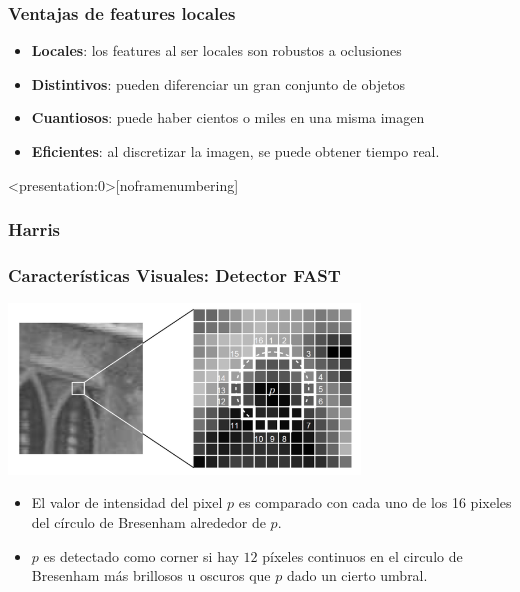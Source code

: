 \begin{frame}
	\frametitle{Ventajas de features locales}
	\footnotesize

	\begin{itemize}
	\item \textbf{Locales}: los features al ser locales son robustos a oclusiones
	\item \textbf{Distintivos}: pueden diferenciar un gran conjunto de objetos
	\item \textbf{Cuantiosos}: puede haber cientos o miles en una misma imagen
	\item \textbf{Eficientes}: al discretizar la imagen, se puede obtener tiempo real.
\end{itemize}
	
\end{frame}

\begin{frame}<presentation:0>[noframenumbering]
	\frametitle{Harris}
	\footnotesize
	
	
\end{frame}

\begin{frame}
	\frametitle{Características Visuales: Detector FAST}
	
	\begin{center}
		\includegraphics[width=0.7\textwidth]{./images/camera/fast}
	\end{center}
	
    \begin{itemize}
        \item El valor de intensidad del pixel $p$ es comparado con cada uno de los 16 pixeles del círculo de Bresenham alrededor de $p$.
        \item $p$ es detectado como corner si hay $12$ píxeles continuos en el circulo de Bresenham más brillosos u oscuros que $p$ dado un cierto umbral.
    \end{itemize}

\end{frame}

